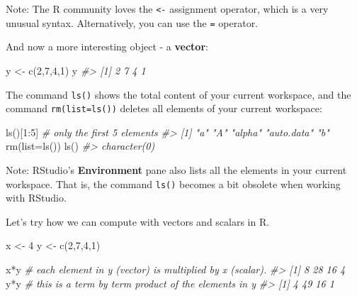 \documentclass[
  14pt,
]{memoir}
\newenvironment{Shaded}{\begin{snugshade}}{\end{snugshade}}
\newcommand{\AttributeTok}[1]{\textcolor[rgb]{0.77,0.63,0.00}{#1}}
\newcommand{\CommentTok}[1]{\textcolor[rgb]{0.56,0.35,0.01}{\textit{#1}}}
\newcommand{\DecValTok}[1]{\textcolor[rgb]{0.00,0.00,0.81}{#1}}
\newcommand{\FunctionTok}[1]{\textcolor[rgb]{0.00,0.00,0.00}{#1}}
\newcommand{\NormalTok}[1]{#1}
\newcommand{\OtherTok}[1]{\textcolor[rgb]{0.56,0.35,0.01}{#1}}
\newcommand{\SpecialCharTok}[1]{\textcolor[rgb]{0.00,0.00,0.00}{#1}}
\begin{document}
Note: The R community loves the \texttt{\textless{}-} assignment operator, which is a very unusual syntax. Alternatively, you can use the \texttt{=} operator.

And now a more interesting object - a \textbf{vector}:

\begin{Shaded}
\begin{Highlighting}[]
\NormalTok{y }\OtherTok{\textless{}{-}} \FunctionTok{c}\NormalTok{(}\DecValTok{2}\NormalTok{,}\DecValTok{7}\NormalTok{,}\DecValTok{4}\NormalTok{,}\DecValTok{1}\NormalTok{)}
\NormalTok{y}
\CommentTok{\#\textgreater{} [1] 2 7 4 1}
\end{Highlighting}
\end{Shaded}

The command \texttt{ls()} shows the total content of your current workspace, and the command \texttt{rm(list=ls())} deletes all elements of your current workspace:

\begin{Shaded}
\begin{Highlighting}[]
\FunctionTok{ls}\NormalTok{()[}\DecValTok{1}\SpecialCharTok{:}\DecValTok{5}\NormalTok{] }\CommentTok{\# only the first 5 elements}
\CommentTok{\#\textgreater{} [1] "a"         "A"         "alpha"     "auto.data" "b"}
\FunctionTok{rm}\NormalTok{(}\AttributeTok{list=}\FunctionTok{ls}\NormalTok{())}
\FunctionTok{ls}\NormalTok{()}
\CommentTok{\#\textgreater{} character(0)}
\end{Highlighting}
\end{Shaded}

Note: RStudio's \textbf{Environment} pane also lists all the elements in your current workspace. That is, the command \texttt{ls()} becomes a bit obsolete when working with RStudio.

Let's try how we can compute with vectors and scalars in R.

\begin{Shaded}
\begin{Highlighting}[]
\NormalTok{x }\OtherTok{\textless{}{-}} \DecValTok{4}
\NormalTok{y }\OtherTok{\textless{}{-}} \FunctionTok{c}\NormalTok{(}\DecValTok{2}\NormalTok{,}\DecValTok{7}\NormalTok{,}\DecValTok{4}\NormalTok{,}\DecValTok{1}\NormalTok{)}

\NormalTok{x}\SpecialCharTok{*}\NormalTok{y }\CommentTok{\# each element in y (vector) is multiplied by x (scalar).}
\CommentTok{\#\textgreater{} [1]  8 28 16  4}
\NormalTok{y}\SpecialCharTok{*}\NormalTok{y }\CommentTok{\# this is a term by term product of the elements in y}
\CommentTok{\#\textgreater{} [1]  4 49 16  1}
\end{Highlighting}
\end{Shaded}
\end{document}
